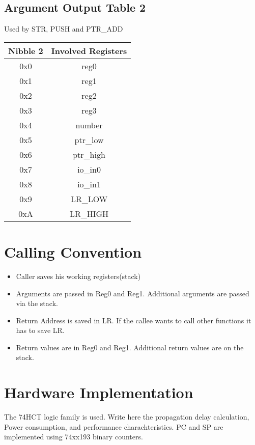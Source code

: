 \documentclass[a4paper, 12pt]{article}
\begin{document}
	\subsection{Argument Output Table 2}
	Used by STR, PUSH and PTR\_ADD
	\begin{center}
		\begin{tabular}{|c|c|}
			\hline
			Nibble 2 & Involved Registers \\ \hline
			0x0 & reg0 \\ \hline
			0x1 & reg1 \\ \hline
			0x2 & reg2 \\ \hline
			0x3 & reg3 \\ \hline
			0x4 & number \\ \hline
			0x5 & ptr\_low \\ \hline
			0x6 & ptr\_high \\ \hline
			0x7 & io\_in0 \\ \hline
			0x8 & io\_in1 \\ \hline
			0x9 & LR\_LOW \\ \hline
			0xA & LR\_HIGH \\ \hline
		\end{tabular}
	\end{center}
	\section{Calling Convention}
	\begin{itemize}
		\item Caller saves his working registers(stack)
		\item Arguments are passed in Reg0 and Reg1. Additional arguments are passed via the stack.
		\item Return Address is saved in LR. If the callee wants to call other functions it has to save LR.
		\item Return values are in Reg0 and Reg1. Additional return values are on the stack.
	\end{itemize}
	\section{Hardware Implementation}
	The 74HCT logic family is used.  Write here the propagation delay calculation, Power consumption, and performance charachteristics.
	PC and SP are implemented using 74xx193 binary counters.
\end{document}
